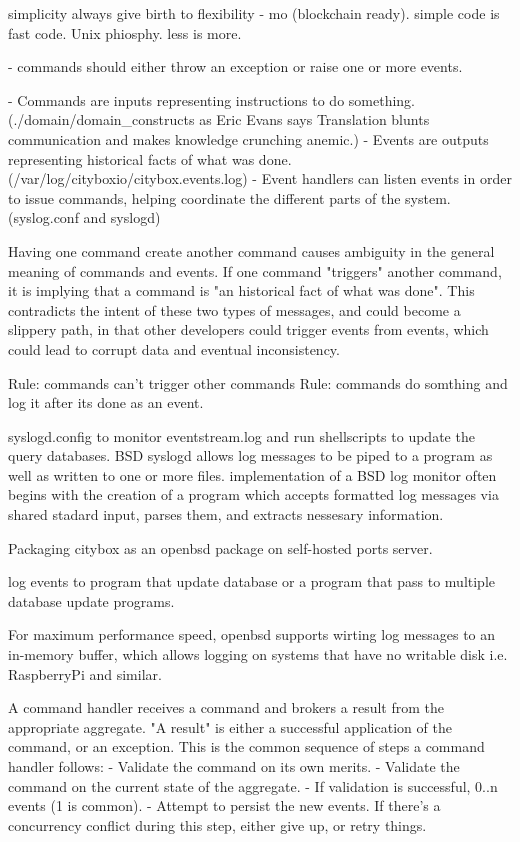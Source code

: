 simplicity always give birth to flexibility - mo (blockchain ready). simple code is fast code. Unix phiosphy. less is more.

- commands should either throw an exception or raise one or more events.


- Commands are inputs representing instructions to do something.(./domain/domain_constructs as Eric Evans says Translation blunts communication and makes knowledge crunching anemic.)
- Events are outputs representing historical facts of what was done. (/var/log/cityboxio/citybox.events.log)
- Event handlers can listen events in order to issue commands, helping coordinate the different parts of the system. (syslog.conf and syslogd)


Having one command create another command causes ambiguity in the general meaning of commands and events.
If one command "triggers" another command, it is implying that a command is "an historical fact of what was done". This contradicts the intent of these two types of messages, and could become a slippery path, in that other developers could trigger events from events, which could lead to corrupt data and eventual inconsistency.

Rule: commands can't trigger other commands
Rule: commands do somthing and log it after its done as an event.


syslogd.config to monitor eventstream.log and run shellscripts to update the query databases.
BSD syslogd allows log messages to be piped to a program as well as written to one or more files.
implementation of a BSD log monitor often begins with the creation of a program which accepts formatted log messages via
shared stadard input, parses them, and extracts nessesary information.

Packaging citybox as an openbsd package on self-hosted ports server.

log events to program that update database or a program that pass to multiple database update programs.

For maximum performance speed, openbsd supports wirting log messages to an in-memory buffer, 
which allows logging on systems that have no writable disk i.e. RaspberryPi and similar.


A command handler receives a command and brokers a result from the appropriate aggregate. "A result" is either a successful application of the command, or an exception. This is the common sequence of steps a command handler follows:
- Validate the command on its own merits.
- Validate the command on the current state of the aggregate.
- If validation is successful, 0..n events (1 is common).
- Attempt to persist the new events. If there's a concurrency conflict during this step, either give up, or retry things.


